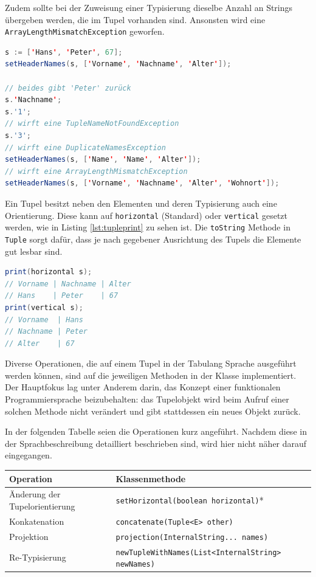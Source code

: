 Zudem sollte bei der Zuweisung einer Typisierung dieselbe Anzahl an Strings übergeben werden, die im Tupel vorhanden sind. Ansonsten
wird eine \lstinline{ArrayLengthMismatchException} geworfen.

\begin{lstlisting}[caption={Referenzierung von Tupelelementen in Tabulang}, label={lst:tuplerefs}, language=Java]
s := ['Hans', 'Peter', 67];
setHeaderNames(s, ['Vorname', 'Nachname', 'Alter']);

// beides gibt 'Peter' zurück
s.'Nachname';
s.'1';
// wirft eine TupleNameNotFoundException
s.'3';
// wirft eine DuplicateNamesException
setHeaderNames(s, ['Name', 'Name', 'Alter']);
// wirft eine ArrayLengthMismatchException
setHeaderNames(s, ['Vorname', 'Nachname', 'Alter', 'Wohnort']);
\end{lstlisting}

Ein Tupel besitzt neben den Elementen und deren Typisierung auch eine Orientierung. Diese kann auf \lstinline{horizontal} (Standard)
oder \lstinline{vertical} gesetzt werden, wie in Listing \ref{lst:tupleprint} zu sehen ist.
Die \lstinline{toString} Methode in \lstinline{Tuple} sorgt dafür, dass
je nach gegebener Ausrichtung des Tupels die Elemente gut lesbar sind.

\begin{lstlisting}[caption={Tupelausgabe mit gegebener Orientierung}, label={lst:tupleprint}, language=Java]
print(horizontal s);
// Vorname | Nachname | Alter
// Hans    | Peter    | 67
print(vertical s);
// Vorname  | Hans
// Nachname | Peter
// Alter    | 67
\end{lstlisting}

Diverse Operationen, die auf einem Tupel in der Tabulang Sprache ausgeführt werden können, sind auf die jeweiligen
Methoden in der Klasse implementiert. Der Hauptfokus lag unter Anderem darin, das Konzept einer funktionalen Programmiersprache
beizubehalten: das Tupelobjekt wird beim Aufruf einer solchen Methode nicht verändert und gibt stattdessen ein neues Objekt zurück.

In der folgenden Tabelle seien die Operationen kurz angeführt. Nachdem diese in der Sprachbeschreibung detailliert beschrieben sind, wird hier
nicht näher darauf eingegangen.

\begin{center}
    \begin{tabular}{ |l|l| } 
        \hline
        Operation & Klassenmethode \\ 
        \hline
        Änderung der Tupelorientierung & \texttt{setHorizontal(boolean horizontal)}* \\ 
        Konkatenation & \texttt{concatenate(Tuple<E> other)} \\
        Projektion & \texttt{projection(InternalString... names)} \\
        Re-Typisierung & \texttt{newTupleWithNames(List<InternalString> newNames)} \\
        \hline
    \end{tabular}
\end{center}

